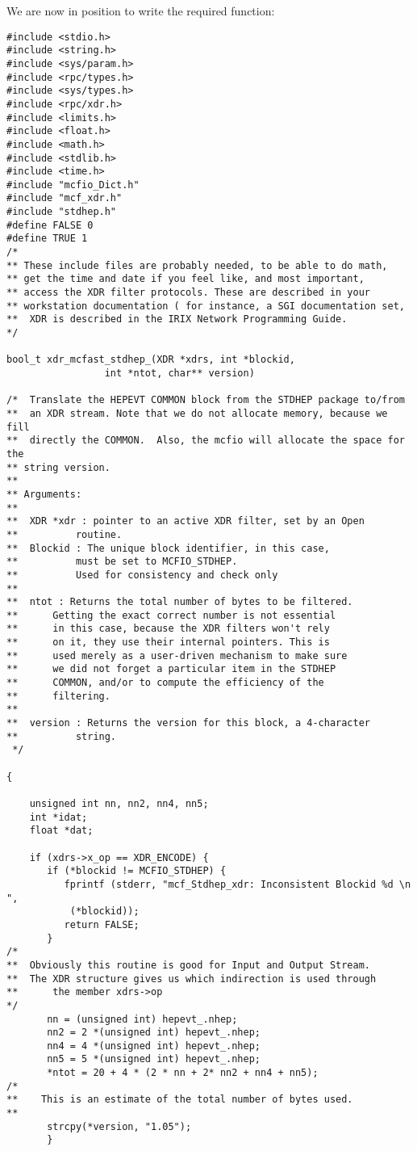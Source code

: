 We are now in position to write the required function:
	
\begin{verbatim}
#include <stdio.h>
#include <string.h>
#include <sys/param.h>
#include <rpc/types.h>
#include <sys/types.h>
#include <rpc/xdr.h>
#include <limits.h>
#include <float.h>
#include <math.h>
#include <stdlib.h>
#include <time.h>
#include "mcfio_Dict.h"
#include "mcf_xdr.h"
#include "stdhep.h"
#define FALSE 0
#define TRUE 1
/*
** These include files are probably needed, to be able to do math, 
** get the time and date if you feel like, and most important, 
** access the XDR filter protocols. These are described in your 
** workstation documentation ( for instance, a SGI documentation set,
**  XDR is described in the IRIX Network Programming Guide. 
*/

bool_t xdr_mcfast_stdhep_(XDR *xdrs, int *blockid,
 				 int *ntot, char** version)
 				 
/*  Translate the HEPEVT COMMON block from the STDHEP package to/from
**  an XDR stream. Note that we do not allocate memory, because we fill
**  directly the COMMON.  Also, the mcfio will allocate the space for the 
** string version. 
** 
** Arguments:
**
**	XDR *xdr : pointer to an active XDR filter, set by an Open 
**			routine.
**	Blockid : The unique block identifier, in this case, 
**			must be set to MCFIO_STDHEP. 
**			Used for consistency and check only
**
**	ntot : Returns the total number of bytes to be filtered.
**		Getting the exact correct number is not essential
**		in this case, because the XDR filters won't rely 
**		on it, they use their internal pointers. This is 
**		used merely as a user-driven mechanism to make sure 
**		we did not forget a particular item in the STDHEP 
**		COMMON, and/or to compute the efficiency of the 
**		filtering. 
**		
**	version : Returns the version for this block, a 4-character 
**			string. 
 */

{
    
    unsigned int nn, nn2, nn4, nn5;
    int *idat;
    float *dat;
    
    if (xdrs->x_op == XDR_ENCODE) {
       if (*blockid != MCFIO_STDHEP) {
          fprintf (stderr, "mcf_Stdhep_xdr: Inconsistent Blockid %d \n ", 
           (*blockid));
          return FALSE;
       }
/*
**	Obviously this routine is good for Input and Output Stream. 
**	The XDR structure gives us which indirection is used through 
**      the member xdrs->op
*/       
       nn = (unsigned int) hepevt_.nhep;
       nn2 = 2 *(unsigned int) hepevt_.nhep;
       nn4 = 4 *(unsigned int) hepevt_.nhep;
       nn5 = 5 *(unsigned int) hepevt_.nhep;
       *ntot = 20 + 4 * (2 * nn + 2* nn2 + nn4 + nn5);
/*
**    This is an estimate of the total number of bytes used. 
**	
       strcpy(*version, "1.05");
       } 
      

\end{verbatim}
